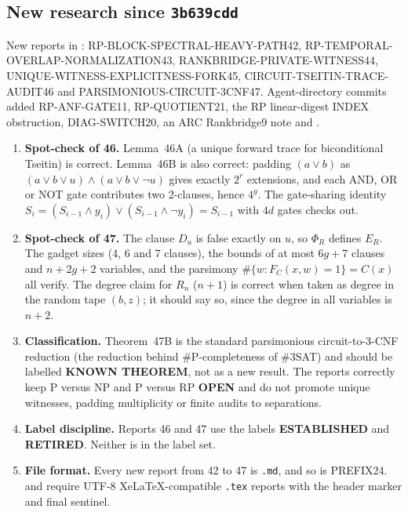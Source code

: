 \documentclass[11pt]{article}
\newcommand{\OPEN}{\textbf{OPEN}}
\newcommand{\KNOWN}{\textbf{KNOWN THEOREM}}
\begin{document}
\subsection{New research since \texttt{3b639cdd}}\label{sec:research}
New reports in : RP-BLOCK-SPECTRAL-HEAVY-PATH42,
RP-TEMPORAL-OVERLAP-NORMALIZATION43, RANKBRIDGE-PRIVATE-WITNESS44,
UNIQUE-WITNESS-EXPLICITNESS-FORK45, CIRCUIT-TSEITIN-TRACE-AUDIT46 and
PARSIMONIOUS-CIRCUIT-3CNF47. Agent-directory commits added RP-ANF-GATE11,
RP-QUOTIENT21, the RP linear-digest INDEX obstruction, DIAG-SWITCH20, an
ARC Rankbridge9 note and .
\begin{enumerate}
\item \textbf{Spot-check of 46.} Lemma~46A (a unique forward trace for
biconditional Tseitin) is correct. Lemma~46B is also correct: padding
$(a\lor b)$ as $(a\lor b\lor u)\land(a\lor b\lor\neg u)$ gives exactly
$2^r$ extensions, and each AND, OR or NOT gate contributes two 2-clauses,
hence $4^g$. The gate-sharing identity
$S_i=(S_{i-1}\land y_i)\lor(S_{i-1}\land\neg y_i)=S_{i-1}$ with $4d$ gates
checks out.
\item \textbf{Spot-check of 47.} The clause $D_u$ is false exactly on $u$,
so $\Phi_R$ defines $E_R$. The gadget sizes (4, 6 and 7 clauses), the
bounds of at most $6g+7$ clauses and $n+2g+2$ variables, and the
parsimony $\#\{w:F_C(x,w)=1\}=C(x)$ all verify. The degree claim for
$R_n$ ($n+1$) is correct when taken as degree in the random tape $(b,z)$;
it should say so, since the degree in all variables is $n+2$.
\item \textbf{Classification.} Theorem~47B is the standard parsimonious
circuit-to-3-CNF reduction (the reduction behind \#P-completeness of
\#3SAT) and should be labelled \KNOWN{}, not as a new result. The reports
correctly keep P versus NP and P versus RP \OPEN{} and do not promote
unique witnesses, padding multiplicity or finite audits to separations.
\item \textbf{Label discipline.} Reports 46 and 47 use the labels
\textbf{ESTABLISHED} and \textbf{RETIRED}. Neither is in the
 label set.
\item \textbf{File format.} Every new report from 42 to 47 is
\texttt{.md}, and so is PREFIX24.  and 
require UTF-8 XeLaTeX-compatible \texttt{.tex} reports with the header
marker and final sentinel.
\end{enumerate}
\end{document}
